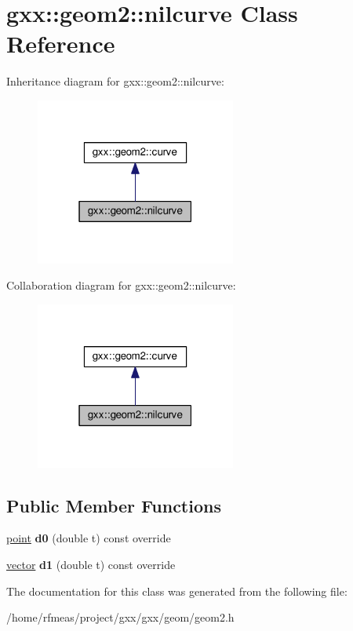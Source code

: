 \hypertarget{classgxx_1_1geom2_1_1nilcurve}{}\section{gxx\+:\+:geom2\+:\+:nilcurve Class Reference}
\label{classgxx_1_1geom2_1_1nilcurve}


Inheritance diagram for gxx\+:\+:geom2\+:\+:nilcurve\+:
\nopagebreak
\begin{figure}[H]
\begin{center}
\leavevmode
\includegraphics[width=187pt]{classgxx_1_1geom2_1_1nilcurve__inherit__graph}
\end{center}
\end{figure}


Collaboration diagram for gxx\+:\+:geom2\+:\+:nilcurve\+:
\nopagebreak
\begin{figure}[H]
\begin{center}
\leavevmode
\includegraphics[width=187pt]{classgxx_1_1geom2_1_1nilcurve__coll__graph}
\end{center}
\end{figure}
\subsection*{Public Member Functions}
\begin{DoxyCompactItemize}
\item 
\hyperlink{classmalgo_1_1vector2}{point} {\bfseries d0} (double t) const override\hypertarget{classgxx_1_1geom2_1_1nilcurve_a87d12be5a44bd9fabbde96afbc007cba}{}\label{classgxx_1_1geom2_1_1nilcurve_a87d12be5a44bd9fabbde96afbc007cba}

\item 
\hyperlink{classmalgo_1_1vector2}{vector} {\bfseries d1} (double t) const override\hypertarget{classgxx_1_1geom2_1_1nilcurve_a3fa9ccda42e598dc9311410d81bfa897}{}\label{classgxx_1_1geom2_1_1nilcurve_a3fa9ccda42e598dc9311410d81bfa897}

\end{DoxyCompactItemize}


The documentation for this class was generated from the following file\+:\begin{DoxyCompactItemize}
\item 
/home/rfmeas/project/gxx/gxx/geom/geom2.\+h\end{DoxyCompactItemize}
